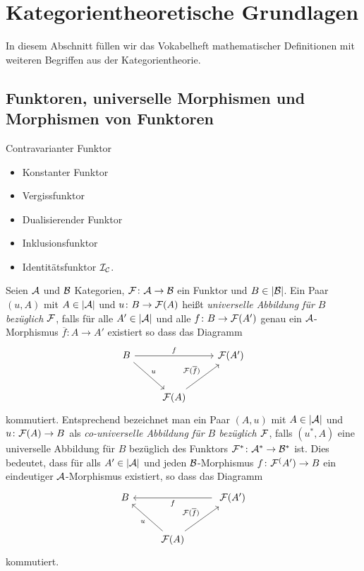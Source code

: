\section{Kategorientheoretische Grundlagen}

In diesem Abschnitt füllen wir das Vokabelheft mathematischer Definitionen mit weiteren Begriffen aus der Kategorientheorie.

\subsection{Funktoren, universelle Morphismen und Morphismen von Funktoren}

\begin{defn}
  
\end{defn}

Contravarianter Funktor

\begin{ex}
  \begin{itemize}
    \item Konstanter Funktor
    \item Vergissfunktor
    \item Dualisierender Funktor
    \item Inklusionsfunktor
    \item Identitätsfunktor $\mathcal{I}_{\mathcal{C}}$.
  \end{itemize}
\end{ex}

\begin{defn}
  Seien $\mathcal{A}$ und $\mathcal{B}$ Kategorien, $\mathcal{F} \colon \mathcal{A} \to \mathcal{B}$ ein Funktor und $B \in |\mathcal{B}|$.
  Ein Paar $(u, A)$ mit $A \in |\mathcal{A}|$ und $u \colon B \to \mathcal{F}(A)$ heißt \emph{universelle Abbildung für $B$ bezüglich $\mathcal{F}$}, falls für alle $A' \in |\mathcal{A}|$ und alle $f \colon B \to \mathcal{F}(A')$ genau ein $\mathcal{A}$-Morphismus $\overline f \colon A \to A'$ existiert so dass das Diagramm
  $$
  \begin{tikzcd}[row sep=2.5em]
    B \arrow[rd,"u"] \arrow[rr, "f"] &&\F(A') \\
    &\F(A) \arrow[ru, "\F(\overline{f})"]
  \end{tikzcd}
  $$
  kommutiert.
  Entsprechend bezeichnet man ein Paar $(A,u)$ mit $A \in |\mathcal{A}|$ und $u \colon \mathcal{F}(A) \to B$ als \emph{co-universelle Abbildung für $B$ bezüglich $\mathcal{F}$}, falls $(u^*, A)$ eine universelle Abbildung für $B$ bezüglich des Funktors $\mathcal{F}^* \colon \mathcal{A}^* \to \mathcal{B}^*$ ist.
  Dies bedeutet, dass für alls $A' \in |\mathcal{A}|$ und jeden $\mathcal{B}$-Morphismus $f \colon \mathcal{F}^(A') \to B$ ein eindeutiger $\mathcal{A}$-Morphismus existiert, so dass das Diagramm
  $$
  \begin{tikzcd}[row sep=2.5em]
    B  && \ \arrow[ll, "f"] \F(A') \\
    & \arrow[lu,"u"] \F(A)\arrow[ru, "\F(\overline{f})"] & 
  \end{tikzcd}
  $$
  kommutiert.
\end{defn}

